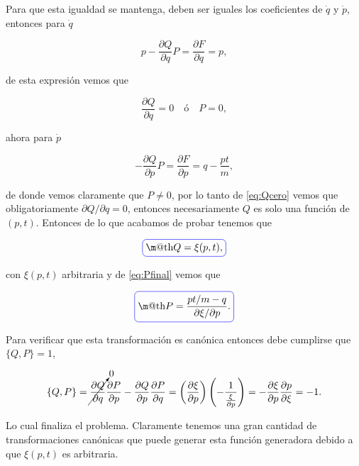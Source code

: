 \documentclass[a4paper,10pt]{article}
\makeatletter
\numberwithin{equation}{section}
\newcommand*{\boxcolor}{blue}
\renewcommand{\boxed}[1]{\textcolor{\boxcolor}{%
\tikz[baseline={([yshift=-1ex]current bounding box.center)}] \node [rectangle, minimum width=1ex,rounded corners,draw] {\normalcolor\m@th$\displaystyle#1$};}}
\makeatother
\begin{document}
Para que esta igualdad se mantenga, deben ser iguales los coeficientes 
de $\dot{q}$ y $\dot{p}$, entonces para $\dot{q}$

\begin{equation}
 p - \frac{\partial Q}{\partial q}P = \frac{\partial F}{\partial q} = p,
\end{equation}

de esta expresión vemos que 

\begin{equation}
 \frac{\partial Q}{\partial q}= 0\quad \text{ó} \quad P = 0,
 \label{eq:Qcero}
\end{equation}

ahora para $\dot{p}$

\begin{equation}
 - \frac{\partial Q}{\partial p} P = \frac{\partial F}{\partial p} = q - \frac{pt}{m},
\label{eq:Pfinal}
\end{equation}

de donde vemos claramente que $P \ne 0$, por lo tanto de \eqref{eq:Qcero} vemos que 
obligatoriamente $\partial Q / \partial q = 0$, entonces necesariamente $Q$ es solo 
una función de $(p,t)$. Entonces de lo que acabamos de probar tenemos que 

\begin{equation}
  \boxed{Q = \xi(p,t),}
\end{equation}

con $\xi(p,t)$ arbitraria y de \eqref{eq:Pfinal} vemos que 

\begin{equation}
 \boxed{P = \frac{pt/m - q}{\partial \xi/\partial p}.}
\end{equation}

Para verificar que esta transformación es canónica entonces debe cumplirse que 
$\{Q,P\} = 1$, 

\begin{equation}
 \{Q,P\} = \cancelto{0}{\frac{\partial Q}{\partial q}}\frac{\partial P}{\partial p} - 
 \frac{\partial Q}{\partial p}\frac{\partial P}{\partial q} = 
 \left(\frac{\partial \xi}{\partial p}\right)\left(- \frac{1}{\frac{\xi}{\partial p}} \right) = 
 - \frac{\partial \xi}{\partial p}\frac{\partial p}{\partial \xi} = -1.
\end{equation}

Lo cual finaliza el problema. Claramente tenemos una gran cantidad de transformaciones 
canónicas que puede generar esta función generadora debido a que $\xi(p,t)$ es arbitraria.
\end{document}
